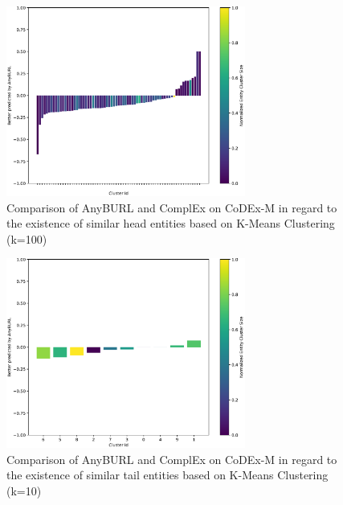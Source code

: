 \begin{figure}[H]
\centering
\includegraphics[width=0.7\textwidth]{images/head_cluster_100_anyburl_complex_codex.PNG}
\caption{Comparison of AnyBURL and ComplEx on CoDEx-M in regard to the existence of similar head entities based on K-Means Clustering (k=100)}
\label{fig:head_cluster_100_anyburl_complex_codex}
\end{figure}

\begin{figure}[H]
\centering
\includegraphics[width=0.7\textwidth]{images/tail_cluster_10_anyburl_complex_codex.PNG}
\caption{Comparison of AnyBURL and ComplEx on CoDEx-M in regard to the existence of similar tail entities based on K-Means Clustering (k=10)}
\label{fig:tail_cluster_10_anyburl_complex_codex}
\end{figure}


